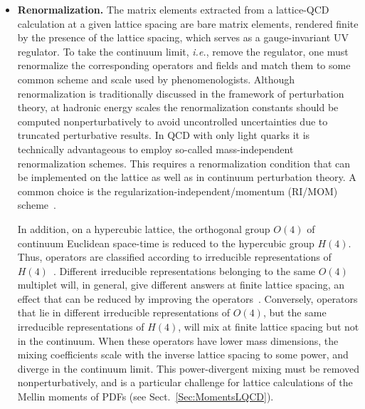 \begin{itemize}
\item {\bfseries Renormalization.} The matrix elements extracted from a 
lattice-QCD calculation at a given lattice spacing are bare matrix elements,
rendered finite by the presence of the lattice spacing, which serves
as a gauge-invariant UV regulator. 
%
To take the continuum limit, {\it i.e.}, remove the regulator, one must 
renormalize the corresponding operators and fields and match them to some 
common scheme and scale used by phenomenologists. 
%
Although renormalization is traditionally
discussed in the framework of perturbation theory, at hadronic energy
scales the renormalization constants should be computed
nonperturbatively to avoid uncontrolled uncertainties due to 
truncated perturbative results.
%
In QCD with only light quarks it is technically
advantageous to employ so-called mass-independent renormalization
schemes.
%
This requires a renormalization condition that can be
implemented on the lattice as well as in continuum perturbation
theory. A common choice is the regularization-independent/momentum (RI/MOM) 
scheme~\cite{Martinelli:1994ty}.

In addition, on a hypercubic lattice, the orthogonal group $O(4)$ of
continuum Euclidean space-time is reduced to the hypercubic group
$H(4)$.
%
Thus, operators are classified according to irreducible
representations of $H(4)$~\cite{Gockeler:1996mu}.
%
Different irreducible representations belonging to the same $O(4)$ multiplet
will, in general, give different answers at finite lattice spacing, an effect 
that can be reduced by improving the operators~\cite{Gockeler:2004wp}.
%
Conversely, operators that lie in different irreducible representations of 
$O(4)$, but the same irreducible representations of $H(4)$, will mix at finite 
lattice spacing but not in the continuum. 
%
When these operators have lower mass dimensions,
the mixing coefficients scale with the inverse lattice spacing to some
power, and diverge in the continuum limit.
%
This power-divergent mixing
must be removed nonperturbatively, and is a particular challenge for
lattice calculations of the Mellin moments of PDFs (see
Sect.~\ref{Sec:MomentsLQCD}).



\end{itemize}
